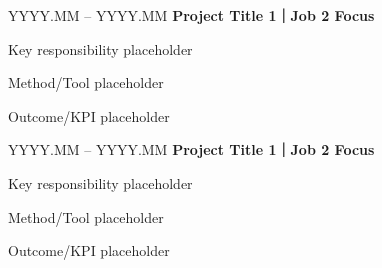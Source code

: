 \begin{twocolentry}{YYYY.MM -- YYYY.MM}
  \textbf{Project Title 1｜Job 2 Focus}
\end{twocolentry}
\begin{onecolentry}
  \begin{highlights}
    \item Key responsibility placeholder
    \item Method/Tool placeholder
    \item Outcome/KPI placeholder
  \end{highlights}
\end{onecolentry}
\vspace{0.20 cm}

\begin{twocolentry}{YYYY.MM -- YYYY.MM}
  \textbf{Project Title 1｜Job 2 Focus}
\end{twocolentry}
\begin{onecolentry}
  \begin{highlights}
    \item Key responsibility placeholder
    \item Method/Tool placeholder
    \item Outcome/KPI placeholder
  \end{highlights}
\end{onecolentry}
\vspace{0.20 cm}
